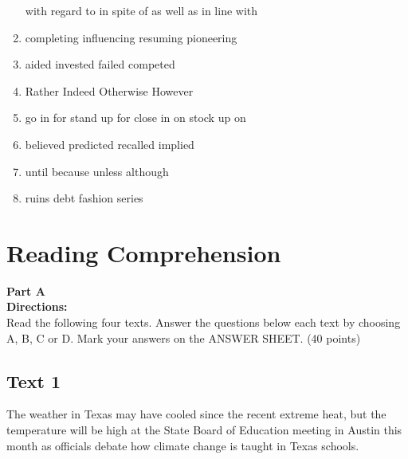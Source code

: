 \begin{enumerate}
\fourchoices
{with regard to}
{in spite of}
{as well as}
{in line with}

\item

\fourchoices
{completing}
{influencing}
{resuming}
{pioneering}

\item

\fourchoices
{aided}
{invested}
{failed}
{competed}

\item

\fourchoices
{Rather}
{Indeed}
{Otherwise}
{However}

\item

\fourchoices
{go in for}
{stand up for}
{close in on}
{stock up on}

\item

\fourchoices
{believed}
{predicted}
{recalled}
{implied}

\item

\fourchoices
{until}
{because}
{unless}
{although}

\item

\fourchoices
{ruins}
{debt}
{fashion}
{series}


\end{enumerate}


\vfil

\section{Reading Comprehension}


\noindent
\textbf{Part A}\\
\textbf{Directions:}\\
Read the following four texts. Answer the questions below each text by
choosing A, B, C or
D. Mark your
answers on the ANSWER SHEET. (40 points)





\newpage

\subsection{Text 1}
The weather in Texas may have cooled since the recent extreme heat, but the temperature will be high at the State Board of Education meeting in Austin this month as officials debate how climate change is taught in Texas schools.

